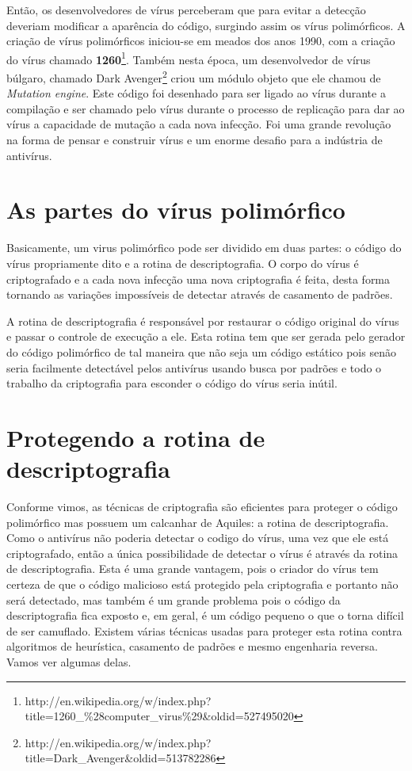 Então, os desenvolvedores de vírus perceberam que para evitar a detecção deveriam modificar a aparência do código, surgindo assim os vírus polimórficos. A criação de vírus polimórficos iniciou-se em meados dos anos 1990, com a criação do vírus chamado \textbf{1260}\footnote{http://en.wikipedia.org/w/index.php?title=1260\_\%28computer\_virus\%29\&oldid=527495020}. Também nesta época, um desenvolvedor de vírus búlgaro, chamado Dark Avenger\footnote{http://en.wikipedia.org/w/index.php?title=Dark\_Avenger\&oldid=513782286} criou um módulo objeto que ele chamou de \textit{Mutation engine}. Este código foi desenhado para ser ligado ao vírus durante a compilação e ser chamado pelo vírus durante o processo de replicação para dar ao vírus a capacidade de mutação a cada nova infecção. Foi uma grande revolução na forma de pensar e construir vírus e um enorme desafio para a indústria de antivírus. 

\section{As partes do vírus polimórfico}
Basicamente, um virus polimórfico pode ser dividido em duas partes: o código do vírus propriamente dito e a rotina de descriptografia. O corpo do vírus é criptografado e a cada nova infecção uma nova criptografia é feita, desta forma tornando as variações impossíveis de detectar através de casamento de padrões.

A rotina de descriptografia é responsável por restaurar o código original do vírus e passar o controle de execução a ele. Esta rotina tem que ser gerada pelo gerador do código polimórfico de tal maneira que não seja um código estático pois senão seria facilmente detectável pelos antivírus usando busca por padrões e todo o trabalho da criptografia para esconder o código do vírus seria inútil.

\section{Protegendo a rotina de descriptografia}
Conforme vimos, as técnicas de criptografia são eficientes para proteger o código polimórfico mas possuem um calcanhar de Aquiles: a rotina de descriptografia. Como o antivírus não poderia detectar o codigo do vírus, uma vez que ele está criptografado, então a única possibilidade de detectar o vírus é através da rotina de descriptografia. Esta é uma grande vantagem, pois o criador do vírus tem certeza de que o código malicioso está protegido pela criptografia e portanto não será detectado, mas também é um grande problema pois o código da descriptografia fica exposto e, em geral, é um código pequeno o que o torna difícil de ser camuflado. Existem várias técnicas usadas para proteger esta rotina contra algoritmos de heurística, casamento de padrões e mesmo engenharia reversa. Vamos ver algumas delas.

